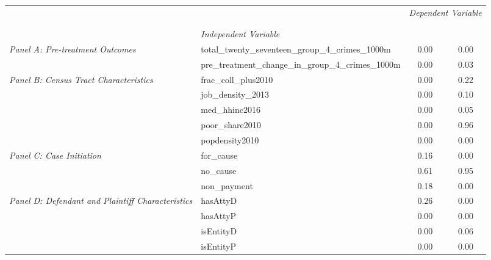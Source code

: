 \begin{tabular}{llcc}
\toprule
 &  & \multicolumn{2}{c}{\textit{Dependent Variable}} \\
\cline{3-4}
\\
 &  &  &  \\
 & \emph{Independent Variable} &  &  \\
\midrule
\multirow[c]{2}{3cm}{\textit{Panel A: Pre-treatment Outcomes}} & total_twenty_seventeen_group_4_crimes_1000m & 0.00 & 0.00 \\
 & pre_treatment_change_in_group_4_crimes_1000m & 0.00 & 0.03 \\
\cline{1-4}
\multirow[c]{5}{3cm}{\textit{Panel B: Census Tract Characteristics}} & frac_coll_plus2010 & 0.00 & 0.22 \\
 & job_density_2013 & 0.00 & 0.10 \\
 & med_hhinc2016 & 0.00 & 0.05 \\
 & poor_share2010 & 0.00 & 0.96 \\
 & popdensity2010 & 0.00 & 0.00 \\
\cline{1-4}
\multirow[c]{3}{3cm}{\textit{Panel C: Case Initiation}} & for_cause & 0.16 & 0.00 \\
 & no_cause & 0.61 & 0.95 \\
 & non_payment & 0.18 & 0.00 \\
\cline{1-4}
\multirow[c]{4}{3cm}{\textit{Panel D: Defendant and Plaintiff Characteristics}} & hasAttyD & 0.26 & 0.00 \\
 & hasAttyP & 0.00 & 0.00 \\
 & isEntityD & 0.00 & 0.06 \\
 & isEntityP & 0.00 & 0.00 \\
\cline{1-4}
\bottomrule
\end{tabular}
